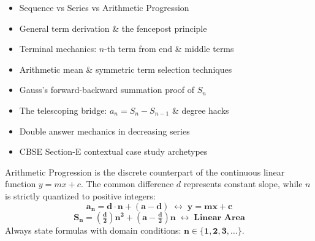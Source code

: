 \documentclass[10pt,a4paper]{article}
\begin{document}
\vspace{2.5mm}
\begin{minipage}[t]{0.48\textwidth}
  \begin{conceptBox}[title=What This Handbook Includes,fonttitle=\bfseries\color{navy}]
    \begin{itemize}
      \item Sequence vs Series vs Arithmetic Progression
      \item General term derivation \& the fencepost principle
      \item Terminal mechanics: $n$-th term from end \& middle terms
      \item Arithmetic mean \& symmetric term selection techniques
      \item Gauss's forward-backward summation proof of $S_n$
      \item The telescoping bridge: $a_n = S_n - S_{n-1}$ \& degree hacks
      \item Double answer mechanics in decreasing series
      \item CBSE Section-E contextual case study archetypes
    \end{itemize}
  \end{conceptBox}
\end{minipage}\hfill
\begin{minipage}[t]{0.48\textwidth}
  \begin{formulaBox}[title=Pedagogical Strategy: Foundations First,fonttitle=\bfseries\color{navy}]
    \raggedright Arithmetic Progression is the discrete counterpart of the continuous linear function $y = mx + c$. The common difference $d$ represents constant slope, while $n$ is strictly quantized to positive integers:
    $$\mathbf{a_n = d \cdot n + (a - d) \;\longleftrightarrow\; y = m x + c}$$
    $$\mathbf{S_n = \left(\tfrac{d}{2}\right)n^2 + \left(a - \tfrac{d}{2}\right)n \;\longleftrightarrow\; \text{Linear Area}}$$
    Always state formulas with domain conditions: $\mathbf{n \in \{1, 2, 3, \dots\}}$.
  \end{formulaBox}
\end{minipage}
\end{document}
